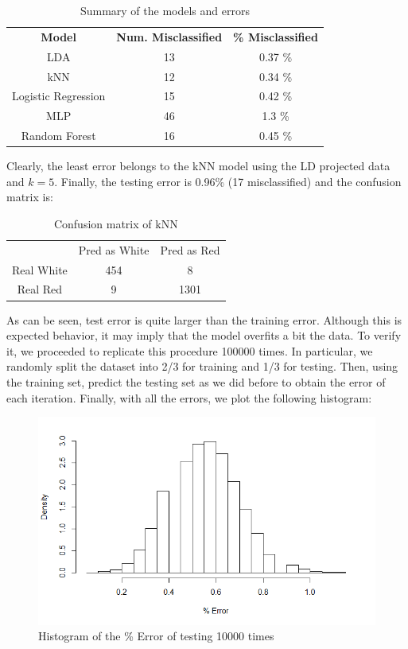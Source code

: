 \documentclass[10pt]{article}
\begin{document}
\begin{table}[H]
\centering
\caption{Summary of the models and errors}
\begin{tabular}{ccc}
\textbf{Model} & \textbf{Num. Misclassified} & \textbf{\% Misclassified} \\
LDA & 13 & 0.37 \% \\
kNN & 12 & 0.34 \% \\
Logistic Regression & 15 & 0.42 \% \\
MLP & 46 & 1.3 \% \\
Random Forest & 16 & 0.45 \%
\end{tabular}
\end{table}

Clearly, the least error belongs to the kNN model using the LD projected data and $k=5$. Finally, the testing error is 0.96\% (17 misclassified) and the confusion matrix is:

\begin{table}[H]
\centering
\caption{Confusion matrix of kNN}
\begin{tabular}{ccc}
 & Pred as White & Pred as Red \\
Real White & 454 & 8 \\
Real Red  & 9 & 1301
\end{tabular}
\end{table}

As can be seen, test error is quite larger than the training error. Although this is expected behavior, it may imply that the model overfits a bit the data. To verify it, we proceeded to replicate this procedure 100000 times. In particular, we randomly split the dataset into 2/3 for training and 1/3 for testing. Then, using the training set, predict the testing set as we did before to obtain the error of each iteration. Finally, with all the errors, we plot the following histogram:

\begin{figure}[H]
\centering
\caption{Histogram of the \% Error of testing 10000 times}
\includegraphics[scale=0.5]{histogramaErrors}
\end{figure}
\end{document}
